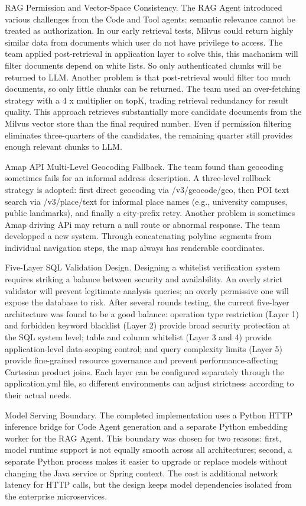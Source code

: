RAG Permission and Vector-Space Consistency. The RAG Agent introduced various challenges from the Code and Tool agents: semantic relevance cannot be treated as authorization. In our early retrieval tests, Milvus could return highly similar data from documents which user do not have privilege to access. The team applied post-retrieval in application layer to solve this, this machanism will filter documents depend on white lists. So only authenticated chunks will be returned to LLM. Another problem is that post-retrieval would filter too much documents, so only little chunks can be returned. The team used an over-fetching strategy with a 4 x multiplier on topK, trading retrieval redundancy for result quality. This approach retrieves substantially more candidate documents from the Milvus vector store than the final required number. Even if permission filtering eliminates three-quarters of the candidates, the remaining quarter still provides enough relevant chunks to LLM.

Amap API Multi-Level Geocoding Fallback. The team found than geocoding sometimes fails for an informal address description. A three-level rollback strategy is adopted: first direct geocoding via /v3/geocode/geo, then POI text search via /v3/place/text for informal place names (e.g., university campuses, public landmarks), and finally a city-prefix retry. Another problem is sometimes Amap driving APi may return a null route or abnormal response. The team developped a new system. Through concatenating polyline segments from individual navigation steps, the map always has renderable coordinates.

Five-Layer SQL Validation Design. Designing a whitelist verification system requires striking a balance between security and availability. An overly strict validator will prevent legitimate analysis queries; an overly permissive one will expose the database to risk. After several rounds testing, the current five-layer architecture was found to be a good balance: operation type restriction (Layer 1) and forbidden keyword blacklist (Layer 2) provide broad security protection at the SQL system level; table and column whitelist (Layer 3 and 4) provide application-level data-scoping control; and query complexity limits (Layer 5) provide fine-grained resource governance and prevent performance-affecting Cartesian product joins. Each layer can be configured separately through the application.yml file, so different environments can adjust strictness according to their actual needs.

Model Serving Boundary. The completed implementation uses a Python HTTP inference bridge for Code Agent generation and a separate Python embedding worker for the RAG Agent. This boundary was chosen for two reasons: first, model runtime support is not equally smooth across all architectures; second, a separate Python process makes it easier to upgrade or replace models without changing the Java service or Spring context. The cost is additional network latency for HTTP calls, but the design keeps model dependencies isolated from the enterprise microservices.

